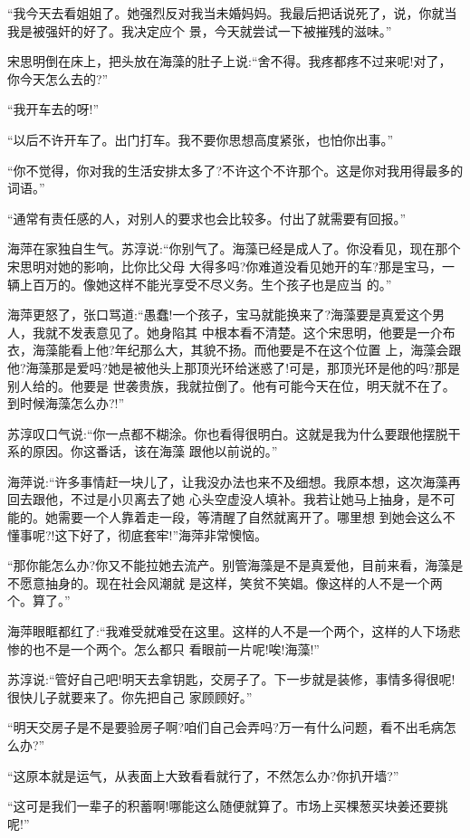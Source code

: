 \documentclass[11pt,a4paper,onecolumn]{article}
\begin{document}
``我今天去看姐姐了。她强烈反对我当未婚妈妈。我最后把话说死了，说，你就当我是被强奸的好了。我决定应个
景，今天就尝试一下被摧残的滋味。''

宋思明倒在床上，把头放在海藻的肚子上说:``舍不得。我疼都疼不过来呢!对了，你今天怎么去的?''

``我开车去的呀!''

``以后不许开车了。出门打车。我不要你思想高度紧张，也怕你出事。''

``你不觉得，你对我的生活安排太多了?不许这个不许那个。这是你对我用得最多的词语。''

``通常有责任感的人，对别人的要求也会比较多。付出了就需要有回报。''

海萍在家独自生气。苏淳说:``你别气了。海藻已经是成人了。你没看见，现在那个宋思明对她的影响，比你比父母
大得多吗?你难道没看见她开的车?那是宝马，一辆上百万的。像她这样不能光享受不尽义务。生个孩子也是应当
的。''

海萍更怒了，张口骂道:``愚蠢!一个孩子，宝马就能换来了?海藻要是真爱这个男人，我就不发表意见了。她身陷其
中根本看不清楚。这个宋思明，他要是一介布衣，海藻能看上他?年纪那么大，其貌不扬。而他要是不在这个位置
上，海藻会跟他?海藻那是爱吗?她是被他头上那顶光环给迷惑了!可是，那顶光环是他的吗?那是别人给的。他要是
世袭贵族，我就拉倒了。他有可能今天在位，明天就不在了。到时候海藻怎么办?!''

苏淳叹口气说:``你一点都不糊涂。你也看得很明白。这就是我为什么要跟他摆脱干系的原因。你这番话，该在海藻
跟他以前说的。''

海萍说:``许多事情赶一块儿了，让我没办法也来不及细想。我原本想，这次海藻再回去跟他，不过是小贝离去了她
心头空虚没人填补。我若让她马上抽身，是不可能的。她需要一个人靠着走一段，等清醒了自然就离开了。哪里想
到她会这么不懂事呢?!这下好了，彻底套牢!''海萍非常懊恼。

``那你能怎么办?你又不能拉她去流产。别管海藻是不是真爱他，目前来看，海藻是不愿意抽身的。现在社会风潮就
是这样，笑贫不笑娼。像这样的人不是一个两个。算了。''

海萍眼眶都红了:``我难受就难受在这里。这样的人不是一个两个，这样的人下场悲惨的也不是一个两个。怎么都只
看眼前一片呢!唉!海藻!''

苏淳说:``管好自己吧!明天去拿钥匙，交房子了。下一步就是装修，事情多得很呢!很快儿子就要来了。你先把自己
家顾顾好。''

``明天交房子是不是要验房子啊?咱们自己会弄吗?万一有什么问题，看不出毛病怎么办?''

``这原本就是运气，从表面上大致看看就行了，不然怎么办?你扒开墙?''

``这可是我们一辈子的积蓄啊!哪能这么随便就算了。市场上买棵葱买块姜还要挑呢!''
\end{document}
